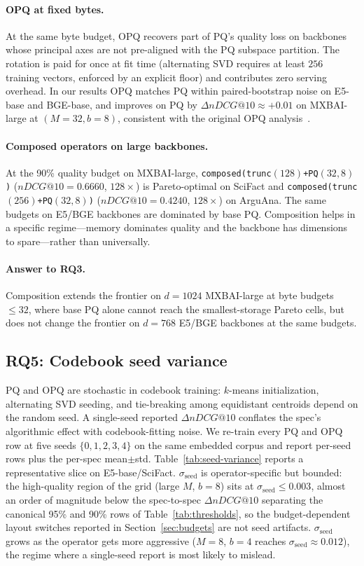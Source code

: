 \documentclass[sigconf]{acmart}
\makeatletter
\newcommand{\ndcg}{nDCG@10}
\makeatother
\begin{document}
\paragraph{OPQ at fixed bytes.}
At the same byte budget, OPQ recovers part of PQ's quality loss on backbones whose principal axes are not pre-aligned with the PQ subspace partition. The rotation is paid for once at fit time (alternating SVD requires at least $256$ training vectors, enforced by an explicit floor) and contributes zero serving overhead. In our results OPQ matches PQ within paired-bootstrap noise on E5-base and BGE-base, and improves on PQ by $\Delta\ndcg{} \approx +0.01$ on MXBAI-large at $(M{=}32, b{=}8)$, consistent with the original OPQ analysis~\cite{ge2014opq}.

\paragraph{Composed operators on large backbones.}
At the 90\% quality budget on MXBAI-large, \texttt{composed(trunc$(128)$+PQ$(32,8)$)} ($\ndcg{} = 0.6660$, $128\times$) is Pareto-optimal on SciFact and \texttt{composed(trunc$(256)$+PQ$(32,8)$)} ($\ndcg{} = 0.4240$, $128\times$) on ArguAna. The same budgets on E5/BGE backbones are dominated by base PQ. Composition helps in a specific regime---memory dominates quality and the backbone has dimensions to spare---rather than universally.

\paragraph{Answer to RQ3.} Composition extends the frontier on $d{=}1024$ MXBAI-large at byte budgets $\le 32$, where base PQ alone cannot reach the smallest-storage Pareto cells, but does not change the frontier on $d{=}768$ E5/BGE backbones at the same budgets.

\subsection{RQ5: Codebook seed variance}
\label{sec:seed-variance}

PQ and OPQ are stochastic in codebook training: $k$-means initialization, alternating SVD seeding, and tie-breaking among equidistant centroids depend on the random seed. A single-seed reported $\Delta\ndcg{}$ conflates the spec's algorithmic effect with codebook-fitting noise. We re-train every PQ and OPQ row at five seeds $\{0,1,2,3,4\}$ on the same embedded corpus and report per-seed rows plus the per-spec mean$\pm$std. Table~\ref{tab:seed-variance} reports a representative slice on E5-base/SciFact. $\sigma_{\text{seed}}$ is operator-specific but bounded: the high-quality region of the grid (large $M$, $b{=}8$) sits at $\sigma_{\text{seed}} \le 0.003$, almost an order of magnitude below the spec-to-spec $\Delta\ndcg{}$ separating the canonical 95\% and 90\% rows of Table~\ref{tab:thresholds}, so the budget-dependent layout switches reported in Section~\ref{sec:budgets} are not seed artifacts. $\sigma_{\text{seed}}$ grows as the operator gets more aggressive ($M{=}8$, $b{=}4$ reaches $\sigma_{\text{seed}} \approx 0.012$), the regime where a single-seed report is most likely to mislead.
\end{document}
